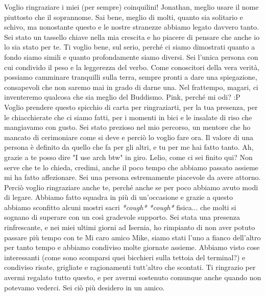 \newline\newline
Voglio ringraziare i miei (per sempre) coinquilini! \newline\newline
Jonathan, meglio usare il nome piuttosto che il soprannome. Sai bene, meglio di molti, quanto sia solitario e schivo, ma nonostante questo e le nostre stranezze abbiamo legato davvero tanto. Sei stato un tassello chiave nella mia crescita e ho piacere di pensare che anche io lo sia stato per te. Ti voglio bene, sul serio, perché ci siamo dimostrati quanto a fondo siamo simili e quanto profondamente siamo diversi. Sei l'unica persona con cui condivido il peso e la leggerezza del verbo. Come conoscitori della vera verità, possiamo camminare tranquilli sulla terra, sempre pronti a dare una spiegazione, consapevoli che non saremo mai in grado di darne una. Nel frattempo, magari, ci inventeremo qualcosa che sia meglio del Buddismo.
\newline\newline
Pink, perché mi odi? :P Voglio prendere questo spicchio di carta per ringraziarti, per la tua presenza, per le chiacchierate che ci siamo fatti, per i momenti in bici e le insalate di riso che mangiavamo con gusto. Sei stato prezioso nel mio percorso, un mentore che ho mancato di cerimoniare come si deve e perciò lo voglio fare ora. Il valore di una persona è definito da quello che fa per gli altri, e tu per me hai fatto tanto. Ah, grazie a te posso dire "I use arch btw" in giro.
\newline\newline
Lelio, come ci sei finito qui? Non serve che te lo chieda, credimi, anche il poco tempo che abbiamo passato assieme mi ha fatto affezionare. Sei una persona estremamente piacevole da avere attorno. Perciò voglio ringraziare anche te, perché anche se per poco abbiamo avuto modi di legare. Abbiamo fatto squadra in più di un'occasione e grazie a questo abbiamo sconfitto alcuni mostri sacri \textit{*cough*} \textit{*cough*} fisica... che molti si sognano di superare con un così gradevole supporto. Sei stata una presenza rinfrescante, e nei miei ultimi giorni ad Isernia, ho rimpianto di non aver potuto passare più tempo con te
\newline\newline
Mi caro amico Mike, siamo stati l'uno a fianco dell'altro per tanto tempo e abbiamo condiviso molte giornate assieme. Abbiamo visto cose interessanti (come sono scomparsi quei bicchieri sulla tettoia del terminal?) e condiviso risate, grigliate e ragionamenti tutt'altro che scontati. Ti ringrazio per avermi regalato tutto questo, e per avermi sostenuto comunque anche quando non potevamo vederci. Sei ciò più desidero in un amico.
